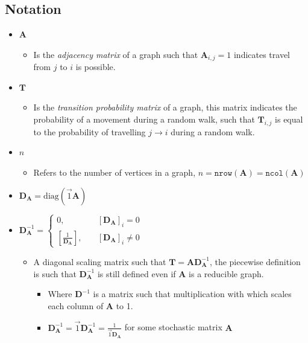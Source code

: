 \documentclass[11pt]{report}
\begin{document}
\subsection{Notation}
\label{notation}
\begin{itemize}
\item \(\mathbf{A}\)
\begin{itemize}
\item Is the \emph{adjacency matrix} of a graph such that \(\mathbf{A}_{i,j} = 1\) indicates travel from \(j\) to \(i\) is possible.
\end{itemize}
\item \(\mathbf{T}\)
\begin{itemize}
\item Is the \emph{transition probability matrix} of a graph, this matrix indicates the probability of a movement during a random walk, such that \(\mathbf{T}_{i,j}\) is equal to the probability of travelling \(j \rightarrow  i\) during a random walk.
\end{itemize}
\item \(n\)
\begin{itemize}
\item Refers to the number of vertices in a graph, \(n = \mathtt{nrow}\left(\mathbf{A}\right) = \mathtt{ncol}\left(\mathbf{A}\right)\)
\end{itemize}
\item \(\mathbf{D}_{\mathbf{A}}=\mathrm{diag}\left(\vec{1}\mathbf{A}\right)\)
\item \(\mathbf{D}_{\mathbf{A}}^{- 1}  =
   \begin{cases}
   0 ,& \quad \left[ \mathbf{D}_{\mathbf{A}} \right]_i = 0 \\
   \left[ \frac{1}{\mathbf{D}_{\mathbf{A}}} \right] ,& \enspace \enspace \left[ \mathbf{D}_{\mathbf{A}} \right]_i \neq 0
   \end{cases}\)
\begin{itemize}
\item A diagonal scaling matrix such that \(\mathbf{T} = \mathbf{A} \mathbf{D}_{\mathbf{A}}^{-1}\), the piecewise definition is such that \(\mathbf{D}^{-1}_{\mathbf{A}}\) is still defined even if \(\mathbf{A}\) is a reducible graph.
\begin{itemize}
\item Where \(\mathbf{D}^{-1}\) is a matrix such that multiplication with which scales each column of \(\mathbf{A}\) to 1.
\item \(\mathbf{D}^{-1}_{\mathbf{A}} = \vec{1}\mathbf{D}^{-1}_{\mathbf{A}} = \frac{1}{\vec{1}\mathbf{D}_{\mathbf{A}}}\) for some stochastic matrix \(\mathbf{A}\)

\end{itemize}
\end{itemize}
\end{itemize}
\end{document}
